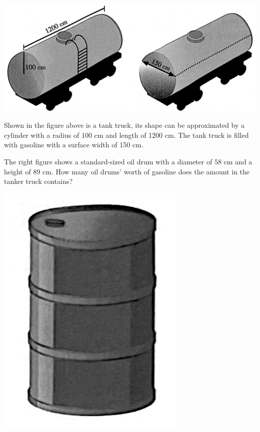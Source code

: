 \documentclass{report}
\begin{document}
\begin{question}
	\begin{center}
		\includegraphics[scale=0.18]{assets/8-24.png}
	\end{center}
	\noindent Shown in the figure above is a tank truck, its shape can be approximated by a cylinder with a radius of 100 cm and length of 1200 cm. The tank truck is filled with gasoline with a surface width of 150 cm.
	
	\begin{vwcol}[widths={0.8,0.2},rule=0pt,sep=1em]
		        
		\vspace{1em}
		\noindent The right figure shows a standard-sized oil drum with a diameter of $58$ cm and a height of $89$ cm. How many oil drums' worth of gasoline does the amount in the tanker truck contains?
		
		\includegraphics[scale=0.18]{assets/8-25.png}
	\end{vwcol}
	

\end{question}
\end{document}
